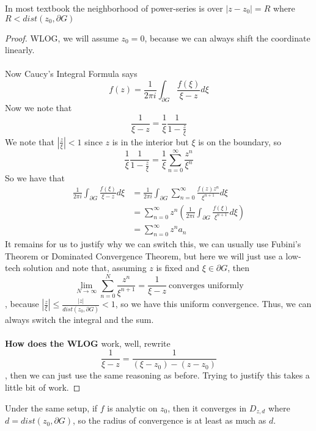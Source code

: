 \begin{remark}
    In most textbook the neighborhood of power-series is over $|z - z_0| = R$ where $R < dist(z_0, \partial G)$
\end{remark}

\begin{proof}
WLOG, we will assume $z_0 = 0$, because we can always shift the coordinate linearly.\\\\
Now Caucy's Integral Formula says
\[f(z) = \frac{1}{2\pi i} \int_{\partial G} \frac{f(\xi)}{\xi - z} d\xi\]
Now we note that
\[\frac{1}{\xi - z} = \frac{1}{\xi} \frac{1}{1 - \frac{z}{\xi}}\]
We note that $|\frac{z}{\xi}| < 1$ since $z$ is in the interior but $\xi$ is on the boundary, so
\[\frac{1}{\xi} \frac{1}{1 - \frac{z}{\xi}} = \frac{1}{\xi} \sum_{n = 0}^\infty \frac{z^n}{\xi^{n}}\]
So we have that
\begin{align*}
     \frac{1}{2\pi i} \int_{\partial G} \frac{f(\xi)}{\xi - z} d\xi &= \frac{1}{2\pi i} \int_{\partial G} \sum_{n = 0}^\infty \frac{f(z) z^n}{\xi^{n+1}} d\xi\\
     &= \sum_{n = 0}^\infty z^n (\frac{1}{2\pi i} \int_{\partial G} \frac{f(\xi)}{\xi^{n+1}} d\xi) \tag*{ASSUMING We can switch integral and sum}\\
     &= \sum_{n = 0}^\infty z^n a_n
\end{align*}
It remains for us to justify why we can switch this, we can usually use Fubini's Theorem or Dominated Convergence Theorem, but here we will just use a low-tech solution and note that, assuming $z$ is fixed and $\xi \in \partial G$, then
\[\lim_{N \to \infty} \sum_{n = 0}^N \frac{z^n}{\xi^{n+1}} = \frac{1}{\xi - z}\ \text{converges uniformly} \]
, because $|\frac{z}{\xi}| \leq \frac{|z|}{dist(z_0, \partial G)} < 1$, so we have this uniform convergence. Thus, we can always switch the integral and the sum.\\\\
\textbf{How does the WLOG} work, well, rewrite
\[\frac{1}{\xi - z} = \frac{1}{(\xi - z_0) - (z - z_0)}\]
, then we can just use the same reasoning as before. Trying to justify this takes a little bit of work.
\end{proof}

\begin{corollary}
    Under the same setup, if $f$ is analytic on $z_0$, then it converges in $D_{z, d}$ where $d = dist(z_0, \partial G)$, so the radius of convergence is at least as much as $d$.
\end{corollary}

